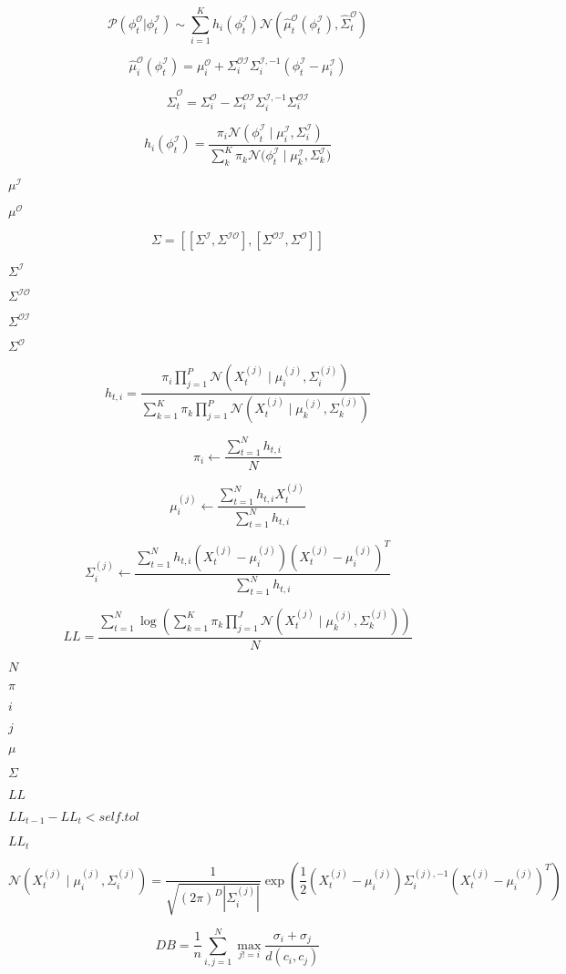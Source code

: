 \documentclass{article}
\begin{document}
\[ \mathcal{P}(\phi_t^\mathcal{O}|\phi_t^\mathcal{I}) \sim \sum_{i=1}^K h_i(\phi_t^\mathcal{I}) \mathcal{N}\left(\hat{\mu}_t^\mathcal{O}(\phi_t^\mathcal{I}), \hat{\Sigma}_t^\mathcal{O}\right) \]
\pagebreak

\[ \hat{\mu}_i^\mathcal{O}(\phi_t^\mathcal{I}) = \mu_i^\mathcal{O} + \Sigma_i^\mathcal{OI}\Sigma_i^{\mathcal{I}, -1}(\phi_t^\mathcal{I} - \mu_i^\mathcal{I}) \]
\pagebreak

\[ \hat{\Sigma}_t^\mathcal{O} = \Sigma_i^\mathcal{O} - \Sigma_i^\mathcal{OI}\Sigma_i^{\mathcal{I}, -1}\Sigma_i^\mathcal{OI} \]
\pagebreak

\[ h_i(\phi_t^\mathcal{I}) = \frac{\pi_i \mathcal{N}(\phi_t^\mathcal{I} \mid \mu_i^\mathcal{I}, \Sigma_i^\mathcal{I})}{\sum_k^K \pi_k \mathcal{N}\mathcal(\phi_t^\mathcal{I} \mid \mu_k^\mathcal{I}, \Sigma_k^\mathcal{I})} \]
\pagebreak

$\mu^\mathcal{I}$
\pagebreak

$\mu^\mathcal{O}$
\pagebreak

\[ \Sigma = [[\Sigma^\mathcal{I}, \Sigma^\mathcal{IO}], [\Sigma^\mathcal{OI}, \Sigma^\mathcal{O}]] \]
\pagebreak

$\Sigma^\mathcal{I}$
\pagebreak

$\Sigma^\mathcal{IO}$
\pagebreak

$\Sigma^\mathcal{OI}$
\pagebreak

$\Sigma^\mathcal{O}$
\pagebreak

\[ h_{t, i} = \frac{\pi_i \prod_{j=1}^P \mathcal{N}\left(X_t^{(j)} \mid \mu_i^{(j)}, \Sigma_i^{(j)}\right)}{\sum_{k=1}^K \pi_k \prod_{j=1}^P \mathcal{N}\left(X_t^{(j)} \mid \mu_k^{(j)}, \Sigma_k^{(j)}\right)} \]
\pagebreak

\[ \pi_i \leftarrow \frac{\sum_{t=1}^N h_{t, i}}{N} \]
\pagebreak

\[ \mu_i^{(j)} \leftarrow \frac{\sum_{t=1}^N h_{t, i} X_t^{(j)}}{\sum_{t=1}^N h_{t, i}} \]
\pagebreak

\[ \Sigma_i^{(j)} \leftarrow \frac{\sum_{t=1}^N h_{t, i} \left(X_t^{(j)} - \mu_i^{(j)}\right)\left(X_t^{(j)} - \mu_i^{(j)}\right)^T}{\sum_{t=1}^N h_{t, i}} \]
\pagebreak

\[ LL = \frac{\sum_{t=1}^N \log\left(\sum_{k=1}^K \pi_k \prod_{j=1}^J\mathcal{N}\left(X_t^{(j)} \mid \mu_k^{(j)}, \Sigma_k^{(j)}\right)\right)}{N} \]
\pagebreak

$N$
\pagebreak

$\pi$
\pagebreak

$i$
\pagebreak

$j$
\pagebreak

$\mu$
\pagebreak

$\Sigma$
\pagebreak

$LL$
\pagebreak

$LL_{t-1} - LL_t < \textit{self.tol}$
\pagebreak

$LL_{t}$
\pagebreak

\[ \mathcal{N}\left(X_t^{(j)} \mid \mu_i^{(j)}, \Sigma_i^{(j)}\right) = \frac{1}{\sqrt{(2\pi)^D|\Sigma_i^{(j)}|}} \exp \left( \frac{1}{2}(X_t^{(j)} - \mu_i^{(j)})\Sigma_i^{(j), -1}(X_t^{(j)} - \mu_i^{(j)})^T\right) \]
\pagebreak

\[ DB = \frac{1}{n} \sum_{i,j=1}^N \max_{j!=i} \frac{\sigma_i + \sigma_j}{d(c_i, c_j)} \]
\pagebreak
\end{document}
